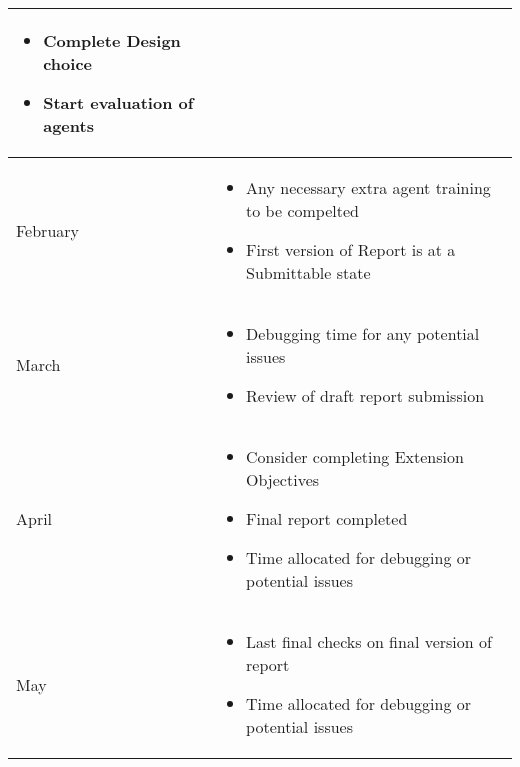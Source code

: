 \documentclass{surrey_disso_style}
\begin{document}
\begin{center}
\begin{tabular}{|p{1.6cm}|p{13cm}|}
\begin{itemize}
      \item Complete Design choice 
      \item Start evaluation of agents
   \end{itemize}\\
   \hline
   February & \begin{itemize}
      \item Any necessary extra agent training to be compelted
      \item First version of Report is at a Submittable state
   \end{itemize}\\
   \hline
   March & \begin{itemize}
      \item Debugging time for any potential issues 
      \item Review of draft report submission
   \end{itemize}\\
   \hline
   April & \begin{itemize}
      \item Consider completing Extension Objectives
      \item Final report completed 
      \item Time allocated for debugging or potential issues
   \end{itemize}\\
   \hline
   May & \begin{itemize}
      \item Last final checks on final version of report
      \item Time allocated for debugging or potential issues
   \end{itemize}\\
   \hline

\end{tabular}
\end{center}

\appendix
%
%



\end{document}
